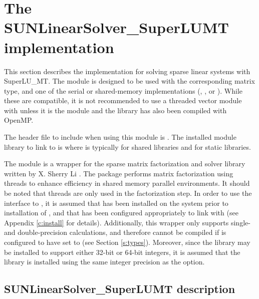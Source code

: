 \section{The SUNLinearSolver\_SuperLUMT implementation}
\label{ss:sunlinsol_superlumt}

This section describes the {\sunlinsol} implementation for solving sparse linear
systems with SuperLU\_MT. The {\superlumt} module is designed to be used with the
corresponding {\sunmatsparse} matrix type, and one of the serial or
shared-memory {\nvector} implementations ({\nvecs}, {\nvecopenmp}, or 
{\nvecpthreads}). While these are compatible, it is not recommended
to use a threaded vector module with {\sunlinsolslumt} unless it is
the {\nvecopenmp} module and the {\superlumt} library has also been
compiled with OpenMP.

The header file to include when using this module 
is . The installed module
library to link to is
where  is typically  for shared libraries and
 for static libraries.

The {\sunlinsolslumt} module is a {\sunlinsol} wrapper for
the {\superlumt} sparse matrix factorization and solver library
written by X. Sherry Li \cite{SuperLUMT_site,Li:05,DGL:99}.  The
package performs matrix factorization using threads to enhance
efficiency in shared memory parallel environments.  It should be noted
that threads are only used in the factorization step.  In
order to use the {\sunlinsolslumt} interface to {\superlumt}, it is
assumed that {\superlumt} has been installed on the system prior to
installation of {\sundials}, and that {\sundials} has been configured
appropriately to link with {\superlumt} (see Appendix \ref{c:install}
for details).  Additionally, this wrapper only supports single- and
double-precision calculations, and therefore cannot be compiled if
{\sundials} is configured to have  set to 
(see Section \ref{s:types}).  Moreover, since the {\superlumt} library
may be installed to support either 32-bit or 64-bit integers, it is
assumed that the {\superlumt} library is installed using the same
integer precision as the {\sundials}  option. {\warn}

\subsection{SUNLinearSolver\_SuperLUMT description}
\label{ss:sunlinsol_slumt_usage}

